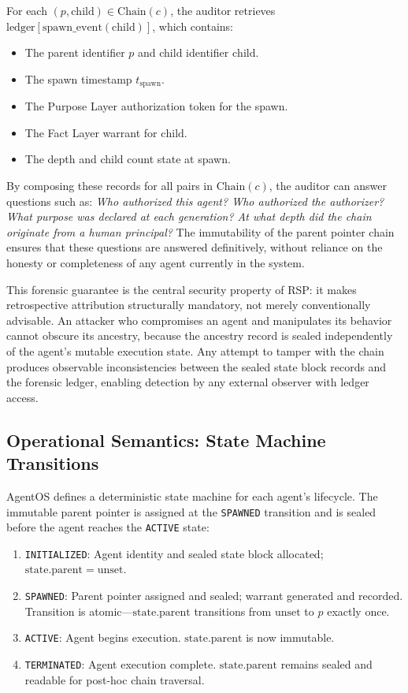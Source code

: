 For each $(p, \text{child}) \in \text{Chain}(c)$, the auditor retrieves $\text{ledger}[\text{spawn\_event}(\text{child})]$, which contains:
\begin{itemize}
    \item The parent identifier $p$ and child identifier $\text{child}$.
    \item The spawn timestamp $t_{\text{spawn}}$.
    \item The Purpose Layer authorization token for the spawn.
    \item The Fact Layer warrant for $\text{child}$.
    \item The depth and child count state at spawn.
\end{itemize}

By composing these records for all pairs in $\text{Chain}(c)$, the auditor can answer questions such as: \emph{Who authorized this agent? Who authorized the authorizer? What purpose was declared at each generation? At what depth did the chain originate from a human principal?} The immutability of the parent pointer chain ensures that these questions are answered definitively, without reliance on the honesty or completeness of any agent currently in the system.

This forensic guarantee is the central security property of RSP: it makes retrospective attribution structurally mandatory, not merely conventionally advisable. An attacker who compromises an agent and manipulates its behavior cannot obscure its ancestry, because the ancestry record is sealed independently of the agent's mutable execution state. Any attempt to tamper with the chain produces observable inconsistencies between the sealed state block records and the forensic ledger, enabling detection by any external observer with ledger access.

\subsection{Operational Semantics: State Machine Transitions}\label{sec:state-machine-transitions}

AgentOS defines a deterministic state machine for each agent's lifecycle. The immutable parent pointer is assigned at the \texttt{SPAWNED} transition and is sealed before the agent reaches the \texttt{ACTIVE} state:

\begin{enumerate}
    \item \texttt{INITIALIZED}: Agent identity and sealed state block allocated; $\text{state}.\text{parent} = \text{unset}$.
    \item \texttt{SPAWNED}: Parent pointer assigned and sealed; warrant generated and recorded. Transition is atomic—$\text{state}.\text{parent}$ transitions from $\text{unset}$ to $p$ exactly once.
    \item \texttt{ACTIVE}: Agent begins execution. $\text{state}.\text{parent}$ is now immutable.
    \item \texttt{TERMINATED}: Agent execution complete. $\text{state}.\text{parent}$ remains sealed and readable for post-hoc chain traversal.
\end{enumerate}

